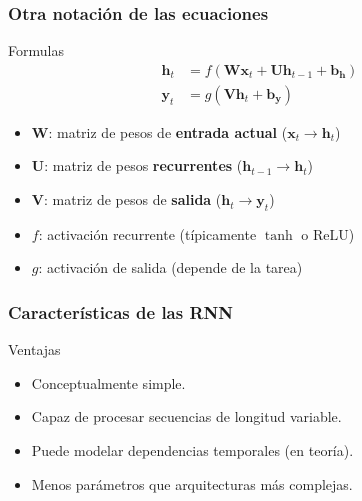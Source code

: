 \documentclass[handout]{beamer}
\newcommand{\vect}[1]{\mathbf{#1}} %
\newcommand{\mat}[1]{\mathbf{#1}}  %
\begin{document}
\begin{frame}
  \frametitle{Otra notación de las ecuaciones}
      \begin{block}{Formulas}
          \begin{align*}
              \vect{h}_t &= f(\mat{W} \vect{x}_t + \mat{U} \vect{h}_{t-1} + \vect{b_h}) \\
              \vect{y}_t &= g(\mat{V} \vect{h}_t + \vect{b_y})
          \end{align*}
  
          \begin{itemize}
              \item $\mat{W}$: matriz de pesos de \textbf{entrada actual} ($\vect{x}_t \rightarrow \vect{h}_t$)
              \item $\mat{U}$: matriz de pesos \textbf{recurrentes} ($\vect{h}_{t-1} \rightarrow \vect{h}_t$)
              \item $\mat{V}$: matriz de pesos de \textbf{salida} ($\vect{h}_t \rightarrow \vect{y}_t$)
              \item $f$: activación recurrente (típicamente $\tanh$ o $\text{ReLU}$)
              \item $g$: activación de salida (depende de la tarea)
          \end{itemize}
      \end{block}
\end{frame}

\begin{frame}
    \frametitle{Características de las RNN}
    \begin{block}{Ventajas}
        \begin{itemize}
            \item Conceptualmente simple.
            \item Capaz de procesar secuencias de longitud variable.
            \item Puede modelar dependencias temporales (en teoría).
            \item Menos parámetros que arquitecturas más complejas.
        \end{itemize}
    \end{block}
\end{frame}
\end{document}
